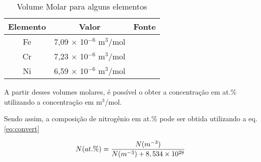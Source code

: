 \begin{table}[ht]
\centering
\setlength{\doublerulesep}{\arrayrulewidth}
{\def\arraystretch{2}\tabcolsep=10pt
\caption{Volume Molar para alguns elementos}
\begin{tabular}{c c c}
\hline\hline
Elemento & Valor & Fonte\\\hline
Fe & 7,09 $\times$ 10$^{-6}$ m$^3$/mol  & \cite{singman1984atomic}\\
Cr & 7,23 $\times$ 10$^{-6}$ m$^3$/mol  & \cite{singman1984atomic}\\
Ni & 6,59 $\times$ 10$^{-6}$ m$^3$/mol  & \cite{singman1984atomic}\\
\hline\hline
\end{tabular}
\label{tab:volmolar}
}
\end{table}

A partir desses volumes molares, é possível o obter a concentração em at.\% utilizando a concentração em m$^3$/mol.

\begin{table}[ht]
\centering
\setlength{\doublerulesep}{\arrayrulewidth}
{\def\arraystretch{2}\tabcolsep=10pt
\caption{Transformação de Unidade para concentração}
}
\end{table}

Sendo assim, a composição de nitrogênio em at.\% pode ser obtida utilizando a eq.\autoref{eq:convert}

\begin{equation}
\label{eq:convert}
	N(at.\%) = \dfrac{N(m^{-3})}{N(m^{-3}) + 8,534 \times 10^{28}\\  } 
\end{equation}

